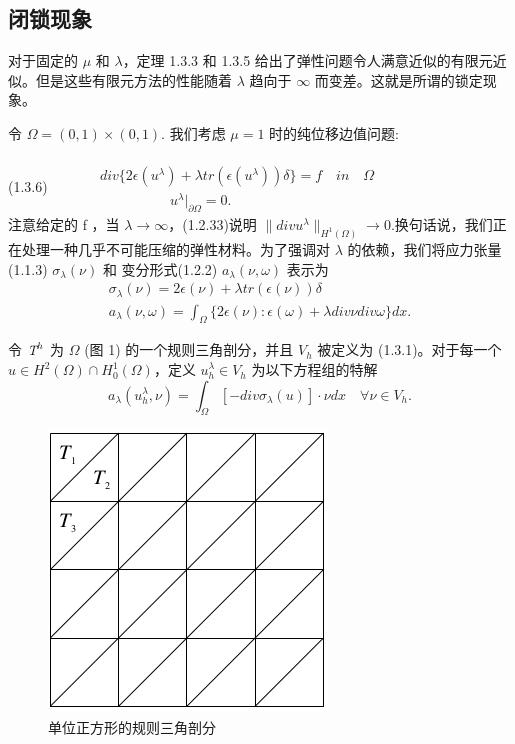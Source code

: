 \documentclass[a4paper,UTF8,titlepage]{ctexart}
\begin{document}
\subsection{闭锁现象}

	对于固定的 $\mu$ 和 $\lambda$，定理 1.3.3 和 1.3.5 给出了弹性问题令人满意近似的有限元近似。但是这些有限元方法的性能随着 $\lambda$ 趋向于 $\infty$ 而变差。这就是所谓的锁定现象。
	\par 
	令 $\Omega = (0,1) \times (0,1)$. 我们考虑 $\mu = 1$ 时的纯位移边值问题:
	\\ \\
	(1.3.6)
	$
	\quad \quad \quad
	\begin{matrix}
		div \{ 2 \epsilon (u^{\lambda}) + \lambda tr (\epsilon (u^{\lambda})) \delta \} = f \quad in \quad \Omega \\ \quad \quad \quad \quad \quad 
		u^{\lambda}|_{\partial \Omega} =  0.
	\end{matrix}
	$
	\\
	注意给定的 f ，当 $\lambda \to \infty$，(1.2.33)说明 $\| div u^{\lambda} \|_{H^1(\Omega)} \to 0$.换句话说，我们正在处理一种几乎不可能压缩的弹性材料。为了强调对 $\lambda$ 的依赖，我们将应力张量(1.1.3) $\sigma_{\lambda}(\nu)$ 和 变分形式(1.2.2) $a_{\lambda}(\nu,\omega)$ 表示为
	$$
	\begin{matrix}
		\sigma_{\lambda}(\nu) = 2 \epsilon(\nu) + \lambda tr (\epsilon(\nu)) \delta \\
		a_{\lambda}(\nu,\omega) = \int_{\Omega} \{ 2 \epsilon(\nu) : \epsilon(\omega) + \lambda div \nu div \omega \} dx.
	\end{matrix}
	$$
	
	令 $\emph{T}^h$ 为 $\Omega $ (图 1) 的一个规则三角剖分，并且 $V_h$ 被定义为 (1.3.1)。对于每一个 $u \in H^2(\Omega) \cap H_0^1(\Omega)$，定义 $u_h^{\lambda} \in V_h$ 为以下方程组的特解
	$$
	a_{\lambda}(u_h^{\lambda},\nu) = \int_{\Omega} 
	[ -div \sigma_{\lambda}(u) ] \cdot \nu dx \quad \forall \nu \in V_h.
	$$
	
	\begin{figure}[hbt]
		\centering
		\includegraphics{../image/Fig.11.1.png}
		\caption{单位正方形的规则三角剖分}
	\end{figure}
	
\end{document}

